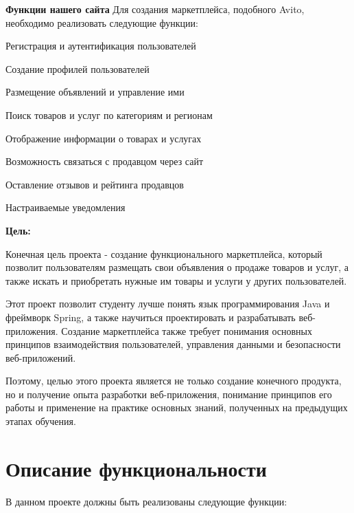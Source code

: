 \textbf{Функции нашего сайта}
Для создания маркетплейса, подобного Avito, необходимо реализовать следующие функции:

\begin{compactitem}
    \item  Регистрация и аутентификация пользователей
    \item  Создание профилей пользователей
    \item  Размещение объявлений и управление ими
    \item  Поиск товаров и услуг по категориям и регионам
    \item  Отображение информации о товарах и услугах
    \item  Возможность связаться с продавцом через сайт
    \item  Оставление отзывов и рейтинга продавцов
    \item  Настраиваемые уведомления
\end{compactitem}



\bigbreak
\bigbreak

\textbf{Цель:}

Конечная цель проекта - создание функционального маркетплейса, который позволит пользователям размещать свои объявления о продаже товаров и услуг, а также искать и приобретать нужные им товары и услуги у других пользователей.

Этот проект позволит студенту лучше понять язык программирования Java и фреймворк Spring, а также научиться проектировать и разрабатывать веб-приложения. Создание маркетплейса также требует понимания основных принципов взаимодействия пользователей, управления данными и безопасности веб-приложений.

Поэтому, целью этого проекта является не только создание конечного продукта, но и получение опыта разработки веб-приложения, понимание принципов его работы и применение на практике основных знаний, полученных на предыдущих этапах обучения.













\section{Описание функциональности}
В данном проекте должны быть реализованы следующие функции:

